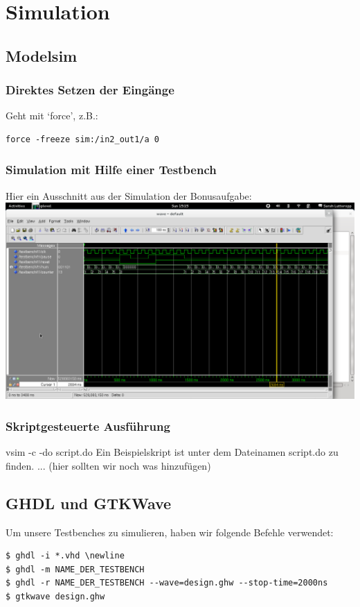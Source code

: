 \documentclass[a4paper, 11pt]{article}
\theoremstyle{definition}
\theoremstyle{plain}
\begin{document}
\section{Simulation}

\subsection{Modelsim}

\subsubsection{Direktes Setzen der Eingänge}
Geht mit `force', z.B.:
\begin{lstlisting}
force -freeze sim:/in2_out1/a 0
\end{lstlisting}

\subsubsection{Simulation mit Hilfe einer Testbench}
Hier ein Ausschnitt aus der Simulation der Bonusaufgabe: \newline
\includegraphics[width=\textwidth]{bonus.png}

\subsubsection{Skriptgesteuerte Ausführung}
vsim -c -do script.do \newline
Ein Beispielskript ist unter dem Dateinamen script.do zu finden. \newline
... (hier sollten wir noch was hinzufügen)

\subsection{GHDL und GTKWave}
Um unsere Testbenches zu simulieren, haben wir folgende Befehle verwendet:
\begin{lstlisting}
$ ghdl -i *.vhd \newline
$ ghdl -m NAME_DER_TESTBENCH
$ ghdl -r NAME_DER_TESTBENCH --wave=design.ghw --stop-time=2000ns
$ gtkwave design.ghw
\end{lstlisting}
\end{document}

